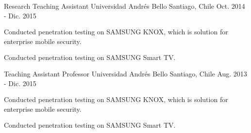 \begin{cventries}
  \cventry
    {Research Teaching Assistant} %
    {Universidad Andrés Bello} %
    {Santiago, Chile} %
    {Oct. 2014 - Dic. 2015} %
    {
      \begin{cvitems} %
        \item {Conducted penetration testing on SAMSUNG KNOX, which is solution for enterprise mobile security.}
        \item {Conducted penetration testing on SAMSUNG Smart TV.}
      \end{cvitems}
    }

  \cventry
    {Teaching Assistant Professor} %
    {Universidad Andrés Bello} %
    {Santiago, Chile} %
    {Aug. 2013 - Dic. 2015} %
    {
      \begin{cvitems} %
        \item {Conducted penetration testing on SAMSUNG KNOX, which is solution for enterprise mobile security.}
        \item {Conducted penetration testing on SAMSUNG Smart TV.}
      \end{cvitems}
    }

\end{cventries}
